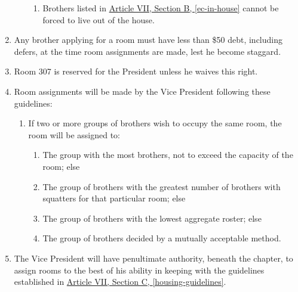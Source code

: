 \begin{enumerate}
\begin{enumerate}
\begin{enumerate}
						\item Brothers listed in \hyperref[ec-in-house]{Article VII, Section B, \autoref*{ec-in-house}} cannot be forced to live out of the house.
					\end{enumerate}
			\end{enumerate}

		\item Any brother applying for a room must have less than \$50 debt, including \glspl{defer}, at the time room assignments are made, lest he become \gls{staggard}.

		\item Room 307 is reserved for the President unless he waives this right.

		\item Room assignments will be made by the Vice President following these guidelines: \label{housing-guidelines}
			\begin{enumerate}
				\item If two or more groups of brothers wish to occupy the same room, the room will be assigned to:

					\begin{enumerate}
						\item The group with the most brothers, not to exceed the capacity of the room; else
						\item The group of brothers with the greatest number of brothers with \gls{squatters} for that particular room; else
						\item The group of brothers with the lowest aggregate \gls{roster}; else
						\item The group of brothers decided by a mutually acceptable method.
					\end{enumerate}
			\end{enumerate}

		\item The Vice President will have penultimate authority, beneath the chapter, to assign rooms to the best of his ability in keeping with the guidelines established in \hyperref[housing-guidelines]{Article VII, Section C, \autoref*{housing-guidelines}}.

	\end{enumerate}
